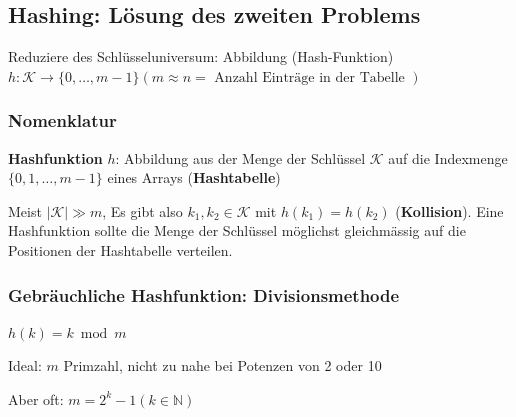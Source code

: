 \begin{sectionbox}
\subsection{Hashing: Lösung des zweiten Problems}\smallskip
Reduziere des Schlüsseluniversum: Abbildung (Hash-Funktion) $h: \mathcal{K} \rightarrow\{0, \ldots, m-1\}(m \approx n=\text { Anzahl Einträge in der Tabelle })$\par

\subsubsection{Nomenklatur}\par\smallskip
\textbf{Hashfunktion} $h$: Abbildung aus der Menge der Schlüssel $\mathcal{K}$ auf die Indexmenge $\{0,1, \ldots, m-1\}$ eines Arrays (\textbf{Hashtabelle})\par
Meist $|\mathcal{K}| \gg m$, Es gibt also $k_{1}, k_{2} \in \mathcal{K}$ mit $h\left(k_{1}\right)=h\left(k_{2}\right)$ (\textbf{Kollision}). Eine Hashfunktion sollte die Menge der Schlüssel möglichst gleichmässig auf die Positionen der Hashtabelle verteilen.\par

\subsubsection{Gebräuchliche Hashfunktion: Divisionsmethode}\par\smallskip
\begin{center}
    $h(k)=k \bmod m$
\end{center}
Ideal: $m$ Primzahl, nicht zu nahe bei Potenzen von 2 oder 10\par
Aber oft: $m=2^{k}-1(k \in \mathbb{N})$
\end{sectionbox}
\vspace{-4pt}
